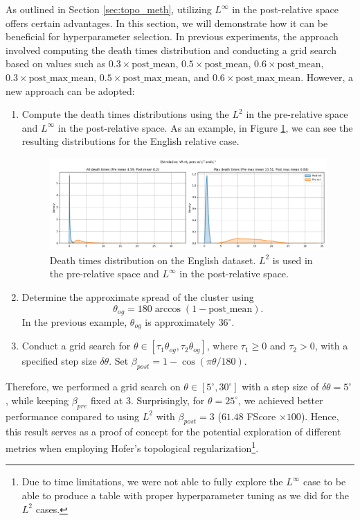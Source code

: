 \documentclass[../main.tex]{subfiles}
\begin{document}
As outlined in Section \ref{sec:topo_meth}, utilizing $L^\infty$ in the post-relative space offers certain advantages. In this section, we will demonstrate how it can be beneficial for hyperparameter selection. In previous experiments, the approach involved computing the death times distribution and conducting a grid search based on values such as $0.3\times \text{post\_mean}$, $0.5\times \text{post\_mean}$, $0.6\times \text{post\_mean}$, $0.3\times \text{post\_max\_mean}$, $0.5\times \text{post\_max\_mean}$, and $0.6\times \text{post\_max\_mean}$. However, a new approach can be adopted:
\begin{enumerate}
    \item Compute the death times distributions using the $L^2$ in the pre-relative space and $L^\infty$ in the post-relative space. As an example, in Figure \ref{fig:distMix}, we can see the resulting distributions for the English relative case.

    \begin{figure}[!ht]
        \centering
        \includegraphics[width=\textwidth]{figures/rs/stitching/mix_en_relative_seed0.png} 
        \caption{Death times distribution on the English dataset. $L^2$ is used in the pre-relative space and $L^\infty$ in the post-relative space.}
        \label{fig:distMix}
    \end{figure}

    \item Determine the approximate spread of the cluster using
    \[\theta_{og} = 180 \arccos(1-\text{post\_mean}).\]
    In the previous example, $\theta_{og}$ is approximately $36^{\circ}$.
    
    \item Conduct a grid search for $\theta \in [\tau_1 \theta_{og}, \tau_2\theta_{og}]$, where $\tau_1\geq 0$ and $\tau_2> 0$, with a specified step size $\delta \theta$. Set $\beta_{post} = 1-\cos(\pi \theta / 180)$.
\end{enumerate}


Therefore, we performed a grid search on $\theta \in [5^{\circ}, 30^{\circ}]$ with a step size of $\delta \theta = 5^{\circ}$, while keeping $\beta_{pre}$ fixed at 3. Surprisingly, for $\theta = 25^{\circ}$, we achieved better performance compared to using $L^2$ with $\beta_{post} = 3$ ($61.48$ FScore $\times 100$). Hence, this result serves as a proof of concept for the potential exploration of different metrics when employing Hofer's topological regularization\footnote{Due to time limitations, we were not able to fully explore the $L^\infty$ case to be able to produce a table with proper hyperparameter tuning as we did for the $L^2$ cases.}.
\end{document}
